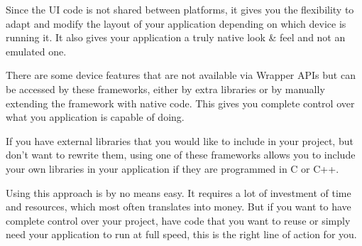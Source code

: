  Since the UI code is not shared between platforms, it gives you the flexibility to adapt and modify the layout of your application depending on which device is running it. It also gives your application a truly native look \& feel and not an emulated one.

 There are some device features that are not available via Wrapper APIs but can be accessed by these frameworks, either by extra libraries or by manually extending the framework with native code. This gives you complete control over what you application is capable of doing.

 If you have external libraries that you would like to include in your project, but don't want to rewrite them, using one of these frameworks allows you to include your own libraries in your application if they are programmed in C or C++. 


Using this approach is by no means easy. It requires a lot of investment of time and resources, which most often translates into money. But if you want to have complete control over your project, have code that you want to reuse or simply need your application to run at full speed, this is the right line of action for you.